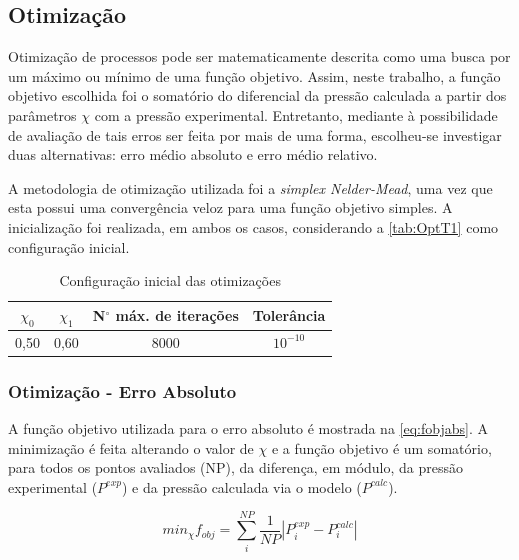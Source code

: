 \clearpage

\subsection{Otimização}
Otimização de processos pode ser matematicamente descrita como uma busca por um
máximo ou mínimo de uma função objetivo. Assim, neste trabalho, a função objetivo escolhida 
foi o somatório do diferencial da pressão calculada a partir dos parâmetros
$\chi$ com a pressão experimental. Entretanto, mediante à possibilidade de
avaliação de tais erros ser feita por mais de uma forma, escolheu-se investigar duas 
alternativas: erro médio absoluto e erro médio relativo.

A metodologia de otimização utilizada foi a \emph{simplex Nelder-Mead}, uma vez
que esta possui uma convergência veloz para uma função objetivo simples. A inicialização 
foi realizada, em ambos os casos, considerando a \autoref{tab:OptT1}  como
configuração inicial.

\begin{table}[htb]
\centering
\renewcommand{\arraystretch}{1.3}
\caption{Configuração inicial das otimizações}
\begin{tabular}{S[table-format=1.2,round-mode=places,round-precision=2]
S[table-format=1.2,round-mode=places,round-precision=2]
S[table-format=4.0,round-mode=places,round-precision=0]
c}
\toprule
{$\chi_0$}& {$\chi_1$} & {N$^\circ$ máx. de iterações} & {Tolerância} 	\\
,50&0,60&8000&{$10^{-10}$}\\
\bottomrule
\end{tabular}
\label{tab:OptT1}
\end{table}

\subsubsection{Otimização - Erro Absoluto}
A função objetivo utilizada para o erro absoluto é mostrada na
\autoref{eq:fobjabs}. A minimização é feita alterando o valor de $\chi$ e a
função objetivo é um somatório, para todos os pontos avaliados (NP), da
diferença, em módulo, da pressão experimental ($P^{exp}$) e da pressão calculada via o modelo
($P^{calc}$).

\begin{equation}\label{eq:fobjabs}
min_\chi f_{obj} = \sum_i^{NP}\frac{1}{NP}\left| P_i^{exp} -
P_i^{calc} \right|
\end{equation}

